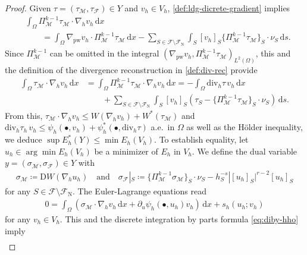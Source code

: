 \documentclass[a4paper]{amsart}
\numberwithin{equation}{section}
\renewcommand{\d}[1]{\,\mathrm{d}#1}
\renewcommand{\div}{\mathrm{div}}
\newcommand{\Mcal}{\mathcal{M}}
\newcommand{\pw}{\mathrm{pw}}
\newcommand{\D}{\mathrm{D}}
\theoremstyle{remark}
\begin{document}
\begin{proof}
	Given $\tau = (\tau_\Mcal, \tau_\mathcal{F}) \in Y$ and $v_h \in V_h$,
    \eqref{def:ldg-dicrete-gradient} implies
    \begin{align*}
        &\int_\Omega \Pi_\Mcal^{k-1} \tau_\Mcal \cdot \nabla_h v_h \d{x}\\
        &\qquad= \int_\Omega \nabla_\pw v_h \cdot \Pi_\Mcal^{k-1} \tau_\Mcal \d{x} - \sum_{S \in \mathcal{F}\setminus\mathcal{F}_\mathrm{N}} \int_S [v_h]_S \{\Pi_\Mcal^{k-1} \tau_\Mcal\}_S \cdot \nu_S \d{s}.
    \end{align*}
    Since $\Pi_\Mcal^{k-1}$ can be omitted in the integral $(\nabla_\pw v_h, \Pi_\Mcal^{k-1} \tau_\Mcal)_{L^2(\Omega)}$,
    this and the definition of the divergence reconstruction in \eqref{def:div-rec} provide
    \begin{align}\label{eq:diby-hho}
        \int_\Omega \tau_\Mcal \cdot \nabla_h v_h \d{x} &= \int_\Omega \Pi_\Mcal^{k-1} \tau_\Mcal \cdot \nabla_h v_h \d{x} = -\int_\Omega \div_h \tau \,v_h \d{x}\nonumber\\
		&\qquad+ \sum_{S \in \mathcal{F} \setminus \mathcal{F}_\mathrm{N}} \int_S [v_h]_S (\tau_S - \{\Pi_\Mcal^{k-1} \tau_\Mcal\}_S \cdot \nu_S) \d{s}.
    \end{align}
	From this, $\tau_\Mcal \cdot \nabla_h v_h \leq W(\nabla_h v_h) + W^*(\tau_\Mcal)$ and $\div_h \tau_h \, v_h \leq \psi_h(\bullet,v_h) + \psi_h^*(\bullet,\div_h \tau)$ a.e.~in $\Omega$ as well as the H\"older inequality, we deduce $\sup E_h^*(Y) \leq \min E_h(V_h)$.
    To establish equality,
	let $u_h \in \arg\min E_h(V_h)$ be a minimizer of $E_h$ in $V_h$. We define the dual variable $y = (\sigma_\Mcal, \sigma_\mathcal{F}) \in Y$ with
	\begin{align}\label{def:dual-variable}
			\sigma_\Mcal \coloneqq \D W(\nabla_h u_h) \quad\text{and}\quad
			\sigma_\mathcal{F}|_S \coloneqq \{\Pi_{\Mcal}^{k-1} \sigma_\Mcal\}_S \cdot \nu_S - h_S^{-s}|[u_h]_S|^{r-2} [u_h]_S
	\end{align}
	for any $S \in \mathcal{F}\setminus\mathcal{F}_\mathrm{N}$.
	The Euler-Lagrange equations read
	\begin{align}\label{eq:dELE}
		0 = \int_\Omega (\sigma_\Mcal \cdot \nabla_h v_h \d{x} + \partial_u \psi_h(\bullet, u_h) v_h) \d{x} + s_h(u_h;v_h)
	\end{align}
	for any $v_h \in V_h$.
	This and
	the discrete
	integration by parts formula \eqref{eq:diby-hho} imply
	\begin{align}\label{eq:proof-mldg-equivalence}

\end{align}
\end{proof}
\end{document}
